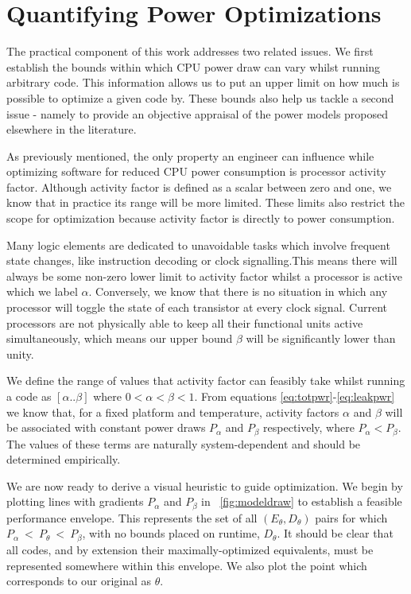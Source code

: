 \section{Quantifying Power Optimizations}
\label{sec:quantifying}

The practical component of this work addresses two related issues. We first establish the bounds within which CPU power draw can vary whilst running arbitrary code. This information allows us to put an upper limit on how much is possible to optimize a given code by. These bounds also help us tackle a second issue - namely to provide an objective appraisal of the power models proposed elsewhere in the literature.

As previously mentioned, the only property an engineer can influence while optimizing software for reduced CPU power consumption is processor activity factor. Although activity factor is defined as a scalar between zero and one, we know that in practice its range will be more limited. These limits also restrict the scope for optimization because activity factor is directly to power consumption.

Many logic elements are dedicated to unavoidable tasks which involve frequent state changes, like instruction decoding or clock signalling.This means there will always be some non-zero lower limit to activity factor whilst a processor is active which we label $\alpha$. Conversely, we know that there is no situation in which any processor will toggle the state of each transistor at every clock signal. Current processors are not physically able to keep all their functional units active simultaneously, which means our upper bound $\beta$ will be significantly lower than unity.

We define the range of values that activity factor can feasibly take whilst running a code as $[\alpha  .. \beta]$ where $0 < \alpha < \beta < 1$. From equations \ref{eq:totpwr}-\ref{eq:leakpwr} we know that, for a fixed platform and temperature, activity factors $\alpha$ and $\beta$ will be associated with constant power draws $P_{\alpha}$ and $P_{\beta}$ respectively, where $P_{\alpha} < P_{\beta}$. The values of these terms are naturally system-dependent and should be determined empirically. 

We are now ready to derive a visual heuristic to guide optimization. We begin by plotting lines with gradients $P_{\alpha}$ and $P_{\beta}$ in \figurename~\ref{fig:modeldraw} to establish a feasible performance envelope. This represents the set of all $(E_\theta, D_\theta)$ pairs for which $P_{\alpha}~<~P_\theta~<~P_{\beta}$, with no bounds placed on runtime, $D_\theta$. It should be clear that all codes,  and by extension their maximally-optimized equivalents, must be represented somewhere within this envelope. We also plot the point which corresponds to our original as $\theta$.

